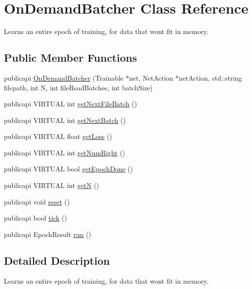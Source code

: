 \hypertarget{classOnDemandBatcher}{\section{On\-Demand\-Batcher Class Reference}
\label{classOnDemandBatcher}
}


Learns an entire epoch of training, for data that wont fit in memory.  


\subsection*{Public Member Functions}
\begin{DoxyCompactItemize}
\item 
publicapi \hyperlink{classOnDemandBatcher_aafdf6b1cd51f52ba6f4664e6d7fafedc}{On\-Demand\-Batcher} (Trainable $\ast$net, Net\-Action $\ast$net\-Action, std\-::string filepath, int N, int file\-Read\-Batches, int batch\-Size)
\item 
publicapi V\-I\-R\-T\-U\-A\-L int \hyperlink{classOnDemandBatcher_a9f591582d681110003e46c9d9c3d9ad2}{get\-Next\-File\-Batch} ()
\item 
publicapi V\-I\-R\-T\-U\-A\-L int \hyperlink{classOnDemandBatcher_a2e728b9916c4a32b1932b9026125a3c9}{get\-Next\-Batch} ()
\item 
publicapi V\-I\-R\-T\-U\-A\-L float \hyperlink{classOnDemandBatcher_ad14816d704e9e654bf1ccfc23dc5f161}{get\-Loss} ()
\item 
publicapi V\-I\-R\-T\-U\-A\-L int \hyperlink{classOnDemandBatcher_ad053841c3f629bb7c489ce6d156cd42e}{get\-Num\-Right} ()
\item 
publicapi V\-I\-R\-T\-U\-A\-L bool \hyperlink{classOnDemandBatcher_a831040bac362a349c338f89537a4408f}{get\-Epoch\-Done} ()
\item 
publicapi V\-I\-R\-T\-U\-A\-L int \hyperlink{classOnDemandBatcher_a59b6fbce7ba9502046a8d25641c19c9b}{get\-N} ()
\item 
publicapi void \hyperlink{classOnDemandBatcher_a2ce361fe87c3be1c85904bd22a0aa39b}{reset} ()
\item 
publicapi bool \hyperlink{classOnDemandBatcher_afbfbd27f32c26b240f74a2aa8290c6fe}{tick} ()
\item 
publicapi Epoch\-Result \hyperlink{classOnDemandBatcher_ae03f6dff2a9313c318bb37bd1041edeb}{run} ()
\end{DoxyCompactItemize}


\subsection{Detailed Description}
Learns an entire epoch of training, for data that wont fit in memory. 


